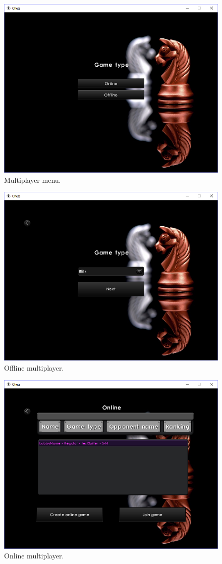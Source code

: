 \documentclass[12pt, a4paper]{article}
\begin{document}
\begin{figure}[ht!]
	\centering
	\includegraphics[width=0.8\linewidth]{figures/multiplayer.png}
	\caption{Multiplayer menu.}
\end{figure}
\begin{figure}[ht!]
	\centering
	\includegraphics[width=0.8\linewidth]{figures/offline.png}
	\caption{Offline multiplayer.}
\end{figure}
\begin{figure}[ht!]
	\centering
	\includegraphics[width=0.8\linewidth]{figures/online.png}
	\caption{Online multiplayer.}
\end{figure}
\end{document}
